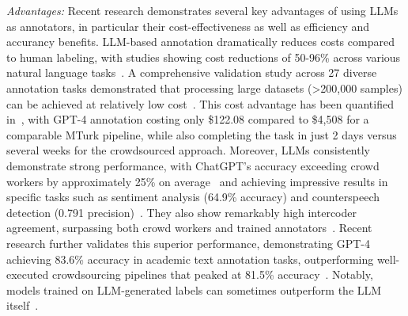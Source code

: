 \documentclass[11pt]{article}
\begin{document}
\emph{Advantages:} Recent research demonstrates several key advantages of using LLMs as annotators, in particular their cost-effectiveness as well as efficiency and accurancy benefits.
LLM-based annotation dramatically reduces costs compared to human labeling, with studies showing cost reductions of 50-96\% across various natural language tasks~\cite{DBLP:conf/emnlp/WangLXZZ21}. A comprehensive validation study across 27 diverse annotation tasks demonstrated that processing large datasets (>200,000 samples) can be achieved at relatively low cost~\cite{DBLP:journals/corr/abs-2306-00176}. This cost advantage has been quantified in~\cite{DBLP:conf/chi/HeHDRH24}, with GPT-4 annotation costing only \$122.08 compared to \$4,508 for a comparable MTurk pipeline, while also completing the task in just 2 days versus several weeks for the crowdsourced approach.
Moreover, LLMs consistently demonstrate strong performance, with ChatGPT's accuracy exceeding crowd workers by approximately 25\% on average~\cite{DBLP:journals/corr/abs-2303-15056} and achieving impressive results in specific tasks such as sentiment analysis (64.9\% accuracy) and counterspeech detection (0.791 precision)~\cite{DBLP:journals/corr/abs-2304-10145}. They also show remarkably high intercoder agreement, surpassing both crowd workers and trained annotators~\cite{DBLP:journals/corr/abs-2303-15056}. Recent research further validates this superior performance, demonstrating GPT-4 achieving 83.6\% accuracy in academic text annotation tasks, outperforming well-executed crowdsourcing pipelines that peaked at 81.5\% accuracy~\cite{DBLP:conf/chi/HeHDRH24}. Notably, models trained on LLM-generated labels can sometimes outperform the LLM itself~\cite{DBLP:conf/emnlp/WangLXZZ21}.
\end{document}
